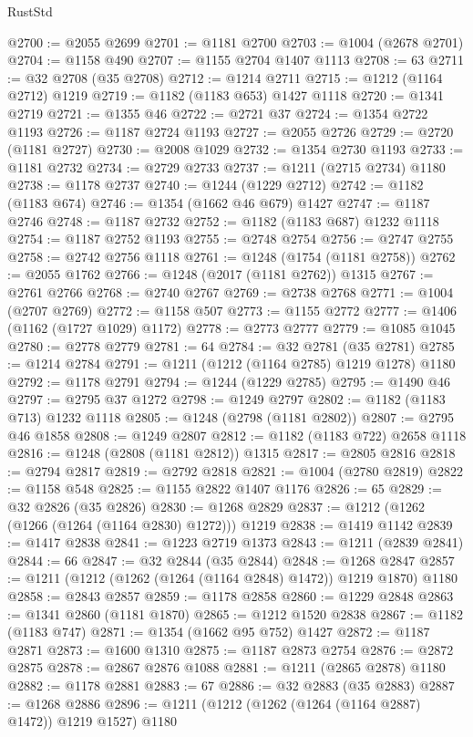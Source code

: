 \begin{lexlean}{RustStd}
\begin{coremodule}
@2700 := @2055 @2699
@2701 := @1181 @2700
@2703 := @1004 (@2678 @2701)
@2704 := @1158 @490
@2707 := @1155 @2704 @1407 @1113
@2708 := 63
@2711 := @32 @2708 (@35 @2708)
@2712 := @1214 @2711
@2715 := @1212 (@1164 @2712) @1219
@2719 := @1182 (@1183 @653) @1427 @1118
@2720 := @1341 @2719
@2721 := @1355 @46
@2722 := @2721 @37
@2724 := @1354 @2722 @1193
@2726 := @1187 @2724 @1193
@2727 := @2055 @2726
@2729 := @2720 (@1181 @2727)
@2730 := @2008 @1029
@2732 := @1354 @2730 @1193
@2733 := @1181 @2732
@2734 := @2729 @2733
@2737 := @1211 (@2715 @2734) @1180
@2738 := @1178 @2737
@2740 := @1244 (@1229 @2712)
@2742 := @1182 (@1183 @674)
@2746 := @1354 (@1662 @46 @679) @1427
@2747 := @1187 @2746
@2748 := @1187 @2732
@2752 := @1182 (@1183 @687) @1232 @1118
@2754 := @1187 @2752 @1193
@2755 := @2748 @2754
@2756 := @2747 @2755
@2758 := @2742 @2756 @1118
@2761 := @1248 (@1754 (@1181 @2758))
@2762 := @2055 @1762
@2766 := @1248 (@2017 (@1181 @2762)) @1315
@2767 := @2761 @2766
@2768 := @2740 @2767
@2769 := @2738 @2768
@2771 := @1004 (@2707 @2769)
@2772 := @1158 @507
@2773 := @1155 @2772
@2777 := @1406 (@1162 (@1727 @1029) @1172)
@2778 := @2773 @2777
@2779 := @1085 @1045
@2780 := @2778 @2779
@2781 := 64
@2784 := @32 @2781 (@35 @2781)
@2785 := @1214 @2784
@2791 := @1211 (@1212 (@1164 @2785) @1219 @1278) @1180
@2792 := @1178 @2791
@2794 := @1244 (@1229 @2785)
@2795 := @1490 @46
@2797 := @2795 @37 @1272
@2798 := @1249 @2797
@2802 := @1182 (@1183 @713) @1232 @1118
@2805 := @1248 (@2798 (@1181 @2802))
@2807 := @2795 @46 @1858
@2808 := @1249 @2807
@2812 := @1182 (@1183 @722) @2658 @1118
@2816 := @1248 (@2808 (@1181 @2812)) @1315
@2817 := @2805 @2816
@2818 := @2794 @2817
@2819 := @2792 @2818
@2821 := @1004 (@2780 @2819)
@2822 := @1158 @548
@2825 := @1155 @2822 @1407 @1176
@2826 := 65
@2829 := @32 @2826 (@35 @2826)
@2830 := @1268 @2829
@2837 := @1212 (@1262 (@1266 (@1264 (@1164 @2830) @1272))) @1219
@2838 := @1419 @1142
@2839 := @1417 @2838
@2841 := @1223 @2719 @1373
@2843 := @1211 (@2839 @2841)
@2844 := 66
@2847 := @32 @2844 (@35 @2844)
@2848 := @1268 @2847
@2857 := @1211 (@1212 (@1262 (@1264 (@1164 @2848) @1472)) @1219 @1870) @1180
@2858 := @2843 @2857
@2859 := @1178 @2858
@2860 := @1229 @2848
@2863 := @1341 @2860 (@1181 @1870)
@2865 := @1212 @1520 @2838
@2867 := @1182 (@1183 @747)
@2871 := @1354 (@1662 @95 @752) @1427
@2872 := @1187 @2871
@2873 := @1600 @1310
@2875 := @1187 @2873 @2754
@2876 := @2872 @2875
@2878 := @2867 @2876 @1088
@2881 := @1211 (@2865 @2878) @1180
@2882 := @1178 @2881
@2883 := 67
@2886 := @32 @2883 (@35 @2883)
@2887 := @1268 @2886
@2896 := @1211 (@1212 (@1262 (@1264 (@1164 @2887) @1472)) @1219 @1527) @1180

\end{coremodule}
\end{lexlean}
